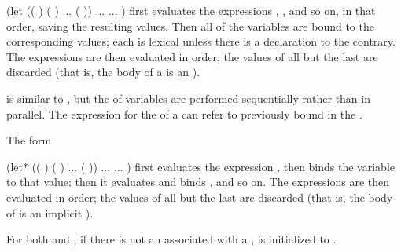 \code
 (let (( )
       ( )
       ...
       ( ))
   ...
   ...
   )
\endcode
first evaluates the expressions , , and so on,
in that order, saving the resulting values.
Then all of the variables  are bound to the corresponding
values; each  is lexical unless
there is a  declaration to the contrary.
The expressions  are then evaluated
in order; the values of all but the last are discarded
(that is, the body of a  
is an ).


is similar to , but the  of variables
are performed sequentially rather than in parallel.  
The expression for the  of a 
 can refer to 
previously bound in the .
                                            
The form

\code
 (let* (( )
        ( )
        ...
        ( ))
   ...
   ...
   )
\endcode
first evaluates the expression , then binds the variable
 to that value; then it evaluates  and binds 
, and so on.
The expressions  are then evaluated
in order; the values of all but the last are discarded
(that is, the body of  is an implicit ).

For both  and ,
if there is not an  associated with a ,
 is initialized to \nil.  


